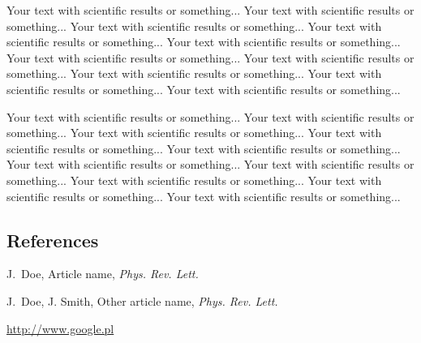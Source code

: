 \documentclass[final]{beamer}
\begin{document}
\begin{frame}[t]
\begin{multicols}{3}
Your text with scientific results or something... 
Your text with scientific results or something... 
Your text with scientific results or something... 
Your text with scientific results or something... 
Your text with scientific results or something... 
Your text with scientific results or something... 
Your text with scientific results or something... 
Your text with scientific results or something... 
Your text with scientific results or something... 
Your text with scientific results or something... 

Your text with scientific results or something... 
Your text with scientific results or something... 
Your text with scientific results or something... 
Your text with scientific results or something... 
Your text with scientific results or something... 
Your text with scientific results or something... 
Your text with scientific results or something... 
Your text with scientific results or something... 
Your text with scientific results or something... 
Your text with scientific results or something... 




\subsection{References}

\begin{thebibliography}{99}

 J.~Doe, Article name, \textit{Phys. Rev. Lett.}

 J.~Doe, J. Smith, Other article name, \textit{Phys. Rev. Lett.}

 \url{http://www.google.pl}

\end{thebibliography}

\end{multicols}

\end{frame}
\end{document}
